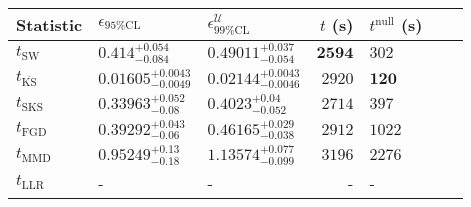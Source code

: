\begin{tabular}{l|llr|llr}
	Statistic & $\epsilon_{95\%\mathrm{CL}}$ & $\epsilon^    {\mathcal{U}}_{99\%\mathrm{CL}}$ & $t$ (s) & $t^{\mathrm{null}}$ (s) \\
	\midrule
	$t_{\mathrm{SW}}$ & $0.414_{-0.084}^{+0.054}$ & $0.49011_{-0.054}^{+0.037}$ & ${\mathbf{2594}}$ & $302$ \\
	$t_{\overline{\mathrm{KS}}}$ & ${\mathbf{0.01605_{-0.0049}^{+0.0043}}}$ & ${\mathbf{0.02144_{-0.0046}^{+0.0043}}}$ & $2920$ & ${\mathbf{120}}$ \\
	$t_{\mathrm{SKS}}$ & $0.33963_{-0.08}^{+0.052}$ & $0.4023_{-0.052}^{+0.04}$ & $2714$ & $397$ \\
	$t_{\mathrm{FGD}}$ & $0.39292_{-0.06}^{+0.043}$ & $0.46165_{-0.038}^{+0.029}$ & $2912$ & $1022$ \\
	$t_{\mathrm{MMD}}$ & $0.95249_{-0.18}^{+0.13}$ & $1.13574_{-0.099}^{+0.077}$ & $3196$ & $2276$ \\
	$t_{\mathrm{LLR}}$ & - & - & - & - \\
	\bottomrule
\end{tabular}